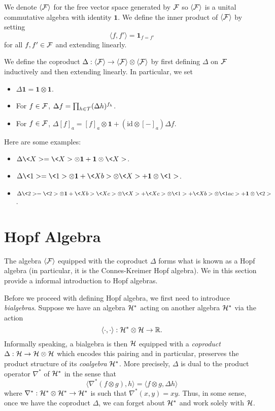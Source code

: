 \documentclass[11pt]{style/preprint}
\begin{document}
We denote \(\langle {\mathcal F} \rangle\) for the free vector space generated by \({\mathcal F}\) so \(\langle {\mathcal F}\rangle\) 
is a unital commutative algebra with identity \(\mathbf{1}\). We define the inner product of \(\langle {\mathcal F} \rangle\)
by setting 
\begin{equation}\label{eq:inner-product}
  \langle f, f'\rangle = \mathbf{1}_{f = f'}
\end{equation}
for all \(f, f' \in {\mathcal F}\) and extending linearly. 

We define the coproduct \(\Delta : \langle {\mathcal F} \rangle \to \langle {\mathcal F} \rangle \otimes \langle {\mathcal F} \rangle\) 
by first defining \(\Delta\) on \({\mathcal F}\) inductively and then extending linearly. In particular, we set
\begin{itemize}
  \item \(\Delta \mathbf{1} = \mathbf{1} \otimes \mathbf{1}\).
  \item For \(f \in {\mathcal F}\), \(\Delta f = \prod_{h \in {\mathcal T}} (\Delta h)^{f_h}\).
  \item For \(f \in {\mathcal F}\), \(\Delta [f]_a = [f]_a \otimes \mathbf{1} + (\text{id} \otimes [-]_a) \Delta f\).
\end{itemize} 
Here are some examples:
\begin{itemize}
  \item \(\Delta \<X> = \<X> \otimes \mathbf{1} + \mathbf{1} \otimes \<X>\).
  \item \(\Delta \<1> = \<1> \otimes \mathbf{1} + \<Xb> \otimes \<X> + \mathbf{1} \otimes \<1>\).
  \item \(\Delta \<2> = \<2> \otimes \mathbf{1} + \<Xb> \<Xc> \otimes \<X> + \<Xc> \otimes \<1> 
    + \<Xb> \otimes \<1ac> + \mathbf{1} \otimes \<2>\).
\end{itemize}

\section{Hopf Algebra}

The algebra \(\langle {\mathcal F}\rangle\) equipped with the coproduct \(\Delta\) forms what is known as a 
Hopf algebra (in particular, it is the Connes-Kreimer Hopf algebra). We in this section provide a 
informal introduction to Hopf algebras.

Before we proceed with defining Hopf algebra, we first need to introduce \textit{bialgebras}.
Suppose we have an algebra \({\mathcal H}^*\) acting on another algebra \({\mathcal H}^*\) via the action 
\[\langle \cdot, \cdot \rangle : {\mathcal H}^* \otimes {\mathcal H} \to \mathbb{R}.\]
Informally speaking, a bialgebra is then \({\mathcal H}\) equipped with a \textit{coproduct} \(\Delta : {\mathcal H} \to {\mathcal H} \otimes {\mathcal H}\) 
which encodes this pairing and in particular, preserves the product structure of its \textit{coalgebra} \({\mathcal H}^*\). More precisely,
\(\Delta\) is dual to the product operator \(\nabla^*\) of \({\mathcal H}^*\) in the sense that 
\[\langle \nabla^*(f \otimes g), h\rangle = \langle f \otimes g, \Delta h\rangle\]
where \(\nabla^* : {\mathcal H}^* \otimes {\mathcal H}^* \to {\mathcal H}^*\) is such that \(\nabla^*(x, y) = xy\). Thus, in some 
sense, once we have the coproduct \(\Delta\), we can forget about \({\mathcal H}^*\) and work solely with \({\mathcal H}\).
\end{document}
